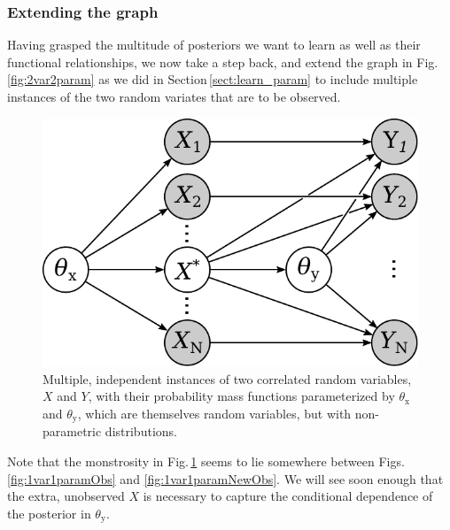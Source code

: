 \documentclass[]{report}
\begin{document}
\subsubsection{Extending the graph}
Having grasped the multitude of posteriors we want to learn as well as their functional relationships, we now take a step back, and extend the graph in Fig.\,\ref{fig:2var2param} as we did in Section\,\ref{sect:learn_param} to include multiple instances of the two random variates that are to be observed.
\begin{figure}[h]
	\centering
	\includegraphics[scale=0.5]{2var_2param_obs}
	\caption{Multiple, independent instances of two correlated random variables, $X$ and $Y$, with their probability mass functions parameterized by $\theta_\mathrm{x}$ and $\theta_\mathrm{y}$, which are themselves random variables, but with non-parametric distributions.}
	\label{fig:2var2paramObs}
\end{figure}
Note that the monstrosity in Fig.\,\ref{fig:2var2paramObs} seems to lie somewhere between Figs.\,\ref{fig:1var1paramObs} and \ref{fig:1var1paramNewObs}. We will see soon enough that the extra, unobserved $X$ is necessary to capture the conditional dependence of the posterior in $\theta_\mathrm{y}$.
\end{document}
